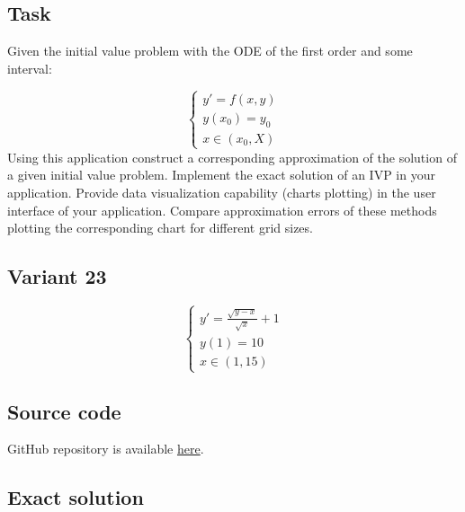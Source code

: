 \documentclass[12pt,letterpaper]{article}
\begin{document}
\begin{center}
    \section*{Task}
\end{center}
Given the initial value problem with the ODE of the first order and some
interval:

\begin{equation*}
 \begin{cases}
   y'=f(x,y)
   \\
   y(x_0) = y_0
   \\
   x \in (x_0, X)
 \end{cases}
\end{equation*}
Using this application construct a corresponding approximation of the solution of a given initial value problem. Implement the exact solution of an IVP in your application. Provide data visualization capability (charts plotting) in the user interface of your application. Compare approximation errors of these methods plotting the corresponding chart for different grid sizes.

\begin{center}
    \subsection*{Variant 23}
\end{center}

\begin{equation*}
 \begin{cases}
   y'=\frac {\sqrt {y - x}}{\sqrt{x}} + 1
   \\
   y(1) = 10
   \\
   x \in (1, 15)
 \end{cases}
\end{equation*}

\begin{center}
    \section*{Source code}
\end{center}

GitHub repository is available \href{https://github.com/AlekseyKorshuk/numerical-methods}{here}.

\begin{center}
    \section*{Exact solution}
\end{center}
\end{document}
